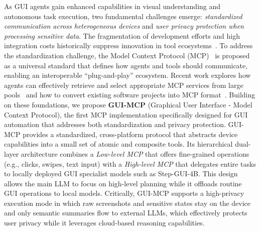 As GUI agents gain enhanced capabilities in visual understanding and autonomous task execution, two fundamental challenges emerge: \textit{standardized communication across heterogeneous devices} and \textit{user privacy protection when processing sensitive data}. The fragmentation of development efforts and high integration costs historically suppress innovation in tool ecosystems~\cite{qu2025toollearning}. To address the standardization challenge, the Model Context Protocol (MCP)~\cite{mcp} is proposed as a universal standard that defines how agents and tools should communicate, enabling an interoperable ``plug-and-play'' ecosystem. Recent work explores how agents can effectively retrieve and select appropriate MCP services from large pools~\cite{gan2025rag_ragmcp} and how to convert existing software projects into MCP format~\cite{ouyang2025code2mcp}. Building on these foundations, we propose \textbf{GUI-MCP} (Graphical User Interface - Model Context Protocol), the first MCP implementation specifically designed for GUI automation that addresses both standardization and privacy protection. GUI-MCP provides a standardized, cross-platform protocol that abstracts device capabilities into a small set of atomic and composite tools. Its hierarchical dual-layer architecture combines a \textit{Low-level MCP} that offers fine-grained operations (e.g., clicks, swipes, text input) with a \textit{High-level MCP} that delegates entire tasks to locally deployed GUI specialist models such as Step-GUI-4B. This design allows the main LLM to focus on high-level planning while it offloads routine GUI operations to local models. Critically, GUI-MCP supports a high-privacy execution mode in which raw screenshots and sensitive states stay on the device and only semantic summaries flow to external LLMs, which effectively protects user privacy while it leverages cloud-based reasoning capabilities.


